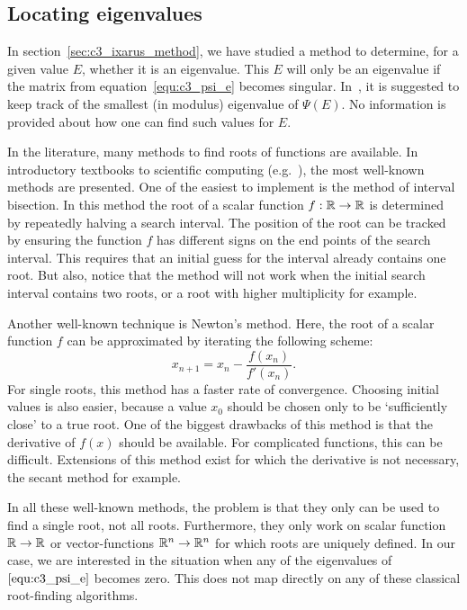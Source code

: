 \subsection{Locating eigenvalues}\label{sec:c3_locating_e}

In section~\ref{sec:c3_ixarus_method}, we have studied a method to determine, for a given value $E$, whether it is an eigenvalue. This $E$ will only be an eigenvalue if the matrix from equation~\eqref{equ:c3_psi_e} becomes singular. In~\cite{ixaru_new_2010}, it is suggested to keep track of the smallest (in modulus) eigenvalue of $\Psi(E)$. No information is provided about how one can find such values for $E$.

In the literature, many methods to find roots of functions are available. In introductory textbooks to scientific computing (e.g.~\cite[Chapter~5]{heath_scientific_2002}), the most well-known methods are presented. One of the easiest to implement is the method of interval bisection. In this method the root of a scalar function $f : \mathbb{R} \to \mathbb{R}$ is determined by repeatedly halving a search interval. The position of the root can be tracked by ensuring the function $f$ has different signs on the end points of the search interval. This requires that an initial guess for the interval already contains one root. But also, notice that the method will not work when the initial search interval contains two roots, or a root with higher multiplicity for example.

Another well-known technique is Newton's method. Here, the root of a scalar function $f$ can be approximated by iterating the following scheme:
$$
  x_{n+1} = x_n - \frac{f(x_n)}{f'(x_n)}\text{.}
$$
For single roots, this method has a faster rate of convergence. Choosing initial values is also easier, because a value $x_0$ should be chosen only to be `sufficiently close' to a true root. One of the biggest drawbacks of this method is that the derivative of $f(x)$ should be available. For complicated functions, this can be difficult. Extensions of this method exist for which the derivative is not necessary, the secant method for example.

In all these well-known methods, the problem is that they only can be used to find a single root, not all roots. Furthermore, they only work on scalar function $\mathbb{R} \to \mathbb{R}$ or vector-functions $\mathbb{R}^n \to \mathbb{R}^n$ for which roots are uniquely defined. In our case, we are interested in the situation when any of the eigenvalues of $\eqref{equ:c3_psi_e}$ becomes zero. This does not map directly on any of these classical root-finding algorithms.

